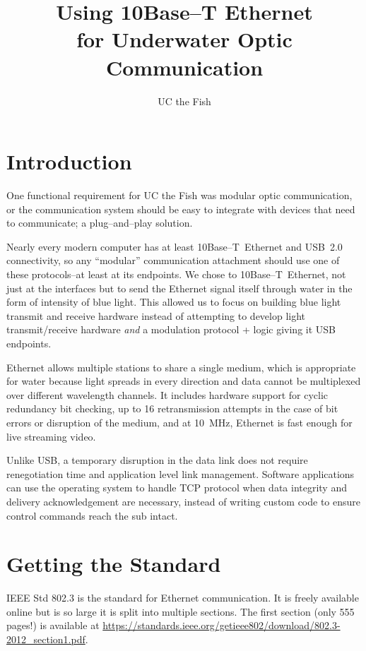 \documentclass{article}
\begin{document}
\title{Using 10Base--T Ethernet\\for Underwater Optic Communication}
\author{UC the Fish}

\maketitle

\section{Introduction}

One functional requirement for UC the Fish was modular optic communication,
or the communication system should be easy to integrate with devices that need to
communicate; a plug--and--play solution.

Nearly every modern computer has at least \mbox{10Base--T Ethernet} and
\mbox{USB 2.0} connectivity, so any ``modular'' communication attachment
should use one of these protocols--at least at its endpoints.
We chose to \mbox{10Base--T Ethernet}, not just at the interfaces but to
send the Ethernet signal itself through water in the form of intensity
of blue light.
This allowed us to focus on building blue light transmit and receive
hardware instead of attempting to develop light transmit/receive hardware
\textit{and} a modulation protocol + logic giving it USB endpoints.

Ethernet allows multiple stations to share a single medium,
which is appropriate for water because light spreads in every direction
and data cannot be multiplexed over different wavelength channels. 
It includes hardware support for cyclic redundancy bit checking,
up to 16 retransmission attempts in the case of bit errors or disruption
of the medium, and at \mbox{10 MHz}, Ethernet is fast enough 
for live streaming video.

Unlike USB, a temporary disruption in the data link does not require
renegotiation time and application level link management.
Software applications can use the operating system to handle TCP protocol
when data integrity and delivery acknowledgement are necessary, instead
of writing custom code to ensure control commands reach the sub intact.

\section{Getting the Standard}

IEEE Std 802.3 is the standard for Ethernet communication.
It is freely available online but is so large it is split into multiple
sections.
The first section (only 555 pages!) is available at
\url{https://standards.ieee.org/getieee802/download/802.3-2012\_section1.pdf}.
\end{document}
